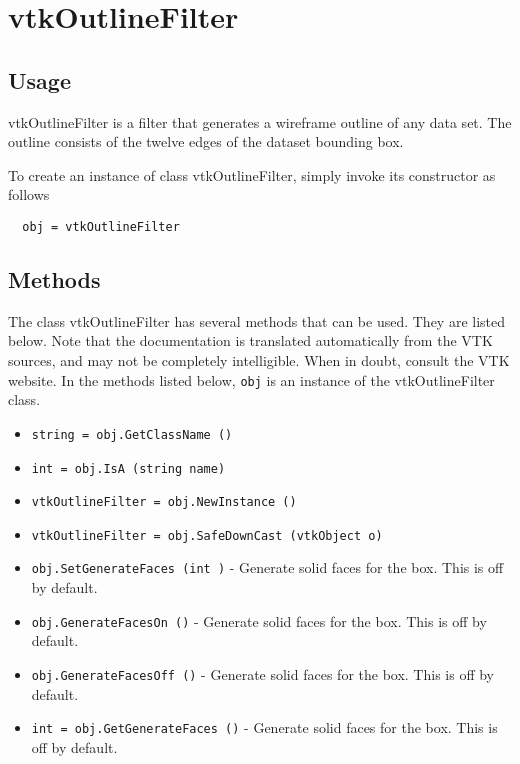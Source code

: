\section{vtkOutlineFilter}

\subsection{Usage}

 vtkOutlineFilter is a filter that generates a wireframe outline of any 
 data set. The outline consists of the twelve edges of the dataset 
 bounding box.

To create an instance of class vtkOutlineFilter, simply
invoke its constructor as follows
\begin{verbatim}
  obj = vtkOutlineFilter
\end{verbatim}
\subsection{Methods}

The class vtkOutlineFilter has several methods that can be used.
  They are listed below.
Note that the documentation is translated automatically from the VTK sources,
and may not be completely intelligible.  When in doubt, consult the VTK website.
In the methods listed below, \verb|obj| is an instance of the vtkOutlineFilter class.
\begin{itemize}
\item  \verb|string = obj.GetClassName ()|

\item  \verb|int = obj.IsA (string name)|

\item  \verb|vtkOutlineFilter = obj.NewInstance ()|

\item  \verb|vtkOutlineFilter = obj.SafeDownCast (vtkObject o)|

\item  \verb|obj.SetGenerateFaces (int )| -  Generate solid faces for the box. This is off by default.

\item  \verb|obj.GenerateFacesOn ()| -  Generate solid faces for the box. This is off by default.

\item  \verb|obj.GenerateFacesOff ()| -  Generate solid faces for the box. This is off by default.

\item  \verb|int = obj.GetGenerateFaces ()| -  Generate solid faces for the box. This is off by default.

\end{itemize}
